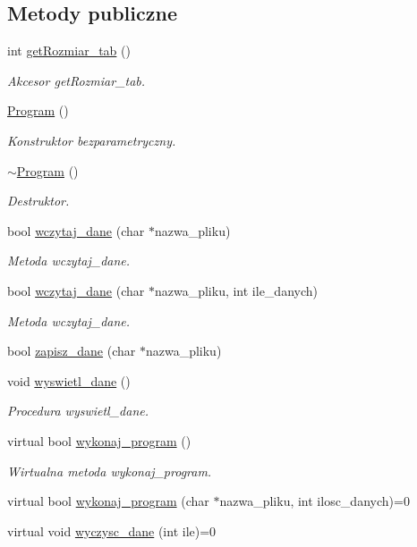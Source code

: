 \subsection*{Metody publiczne}
\begin{DoxyCompactItemize}
\item 
int \hyperlink{class_program_a4fb9c2979a0dca1e14c75f4cc461bebd}{get\-Rozmiar\-\_\-tab} ()
\begin{DoxyCompactList}\small\item\em Akcesor get\-Rozmiar\-\_\-tab. \end{DoxyCompactList}\item 
\hyperlink{class_program_aaefaa0df08f3484476fc4d61e97acbdc}{Program} ()
\begin{DoxyCompactList}\small\item\em Konstruktor bezparametryczny. \end{DoxyCompactList}\item 
\hyperlink{class_program_a986aef1c50e1d338a3315a47ba6df549}{$\sim$\-Program} ()
\begin{DoxyCompactList}\small\item\em Destruktor. \end{DoxyCompactList}\item 
bool \hyperlink{class_program_a618d9d6e3255ca5ff3d65de0385c6d46}{wczytaj\-\_\-dane} (char $\ast$nazwa\-\_\-pliku)
\begin{DoxyCompactList}\small\item\em Metoda wczytaj\-\_\-dane. \end{DoxyCompactList}\item 
bool \hyperlink{class_program_a6bfc0c61a365d212dbb73e95034185c1}{wczytaj\-\_\-dane} (char $\ast$nazwa\-\_\-pliku, int ile\-\_\-danych)
\begin{DoxyCompactList}\small\item\em Metoda wczytaj\-\_\-dane. \end{DoxyCompactList}\item 
bool \hyperlink{class_program_a0a0d555a69e791820a70000375462e32}{zapisz\-\_\-dane} (char $\ast$nazwa\-\_\-pliku)
\item 
void \hyperlink{class_program_ac939bc41859b867dd631163f6540573f}{wyswietl\-\_\-dane} ()
\begin{DoxyCompactList}\small\item\em Procedura wyswietl\-\_\-dane. \end{DoxyCompactList}\item 
virtual bool \hyperlink{class_program_ac396401ba5cade863d0e6acb727bec4e}{wykonaj\-\_\-program} ()
\begin{DoxyCompactList}\small\item\em Wirtualna metoda wykonaj\-\_\-program. \end{DoxyCompactList}\item 
virtual bool \hyperlink{class_program_afc2ba31ffb01e8d2c6448a222fa02c8c}{wykonaj\-\_\-program} (char $\ast$nazwa\-\_\-pliku, int ilosc\-\_\-danych)=0
\item 
virtual void \hyperlink{class_program_a4f26df1d57d90eeb7095e1ef2fe4c229}{wyczysc\-\_\-dane} (int ile)=0
\end{DoxyCompactItemize}
